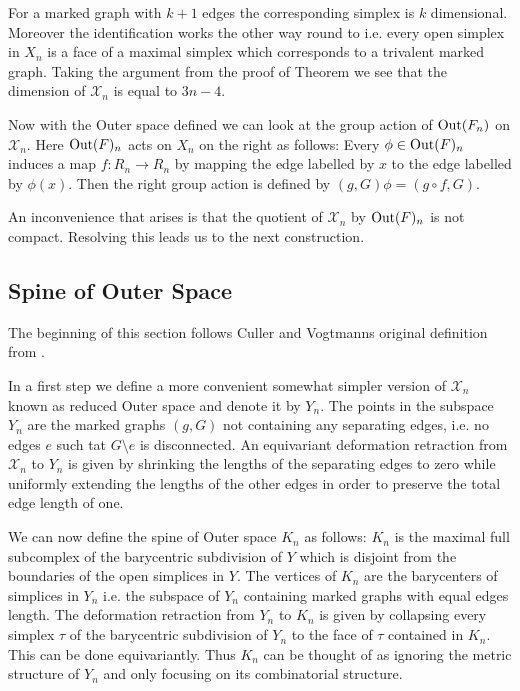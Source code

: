 For a marked graph with $k+1$ edges the corresponding simplex is $k$ dimensional.
Moreover the identification works the other way round to i.e. every open simplex in $X_{n}$ 
is a face of a maximal simplex which corresponds to a trivalent marked graph.
Taking the argument from the proof of Theorem \label{thm:finGenCn} we see that the dimension of $\mathcal{X}_{n}$ is equal to $3n -4$.

Now with the Outer space defined we can look at the group action of $\operatorname{Out}(F_{n})$ on $\mathcal{X}_{n}$.
Here $\operatorname{Out}(F)_{n}$ acts on $X_{n}$ on the right as follows:
Every $\phi \in \operatorname{Out}(F)_{n}$ induces a map $f: R_{n} \to R_{n}$ by mapping the edge labelled
by $x$ to the edge labelled by $\phi(x)$.
Then the right group action is defined by $(g,G) \phi = (g \circ f, G)$.

An inconvenience that arises is that the quotient of $\mathcal{X}_{n}$ by $\operatorname{Out}(F)_{n}$ is not compact.
Resolving this leads us to the next construction.

\subsection{Spine of Outer Space}
The beginning of this section follows Culler and Vogtmanns original definition from \cite{vogtmann86}.

In a first step we define a more convenient somewhat simpler version of $\mathcal{X}_{n}$ known as reduced Outer space and denote it by $Y_{n}$.
The points in the subspace $Y_{n}$ are the marked graphs $(g,G)$ not containing any separating edges, i.e.
no edges $e$ such tat $G \setminus e$ is disconnected.
An equivariant deformation retraction from $\mathcal{X}_{n}$ to $Y_{n}$ is given by shrinking the lengths of
the separating edges to zero while uniformly extending the lengths of the other edges in order to preserve the total edge length of one.

We can now define the spine of Outer space $K_{n}$ as follows:
$K_{n}$ is the maximal full subcomplex of the barycentric subdivision of $Y$ which is disjoint from the boundaries of the open simplices in $Y$.
The vertices of $K_{n}$ are the barycenters of simplices in $Y_{n}$ i.e. the subspace of $Y_{n}$ containing marked graphs 
with equal edges length. The deformation retraction from $Y_{n}$ to $K_{n}$ is given by
collapsing every simplex $\tau$ of the barycentric subdivision of $Y_{n}$ to the face of $\tau$ contained in $K_{n}$.
This can be done equivariantly.
Thus $K_{n}$ can be thought of as ignoring the metric structure of $Y_{n}$ and only focusing on its combinatorial structure.

